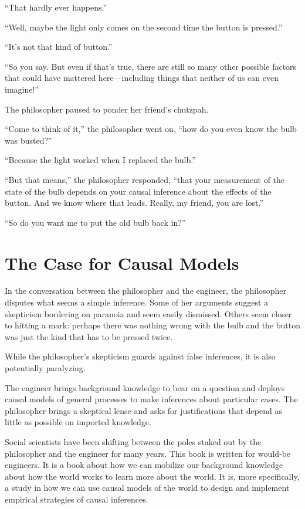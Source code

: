 \documentclass[
  12pt,
]{book}
\begin{document}
``That hardly ever happens.''

``Well, maybe the light only comes on the second time the button is pressed.''

``It's not that kind of button.''

``So you say. But even if that's true, there are still so many other possible factors that could have mattered here---including things that neither of us can even imagine!''

The philosopher paused to ponder her friend's chutzpah.

``Come to think of it,'' the philosopher went on, ``how do you even know the bulb was busted?''

``Because the light worked when I replaced the bulb.''

``But that means,'' the philosopher responded, ``that your measurement of the state of the bulb depends on your causal inference about the effects of the button. And we know where that leads. Really, my friend, you are lost.''

``So do you want me to put the old bulb back in?''

\hypertarget{the-case-for-causal-models}{%
\section{The Case for Causal Models}\label{the-case-for-causal-models}}

In the conversation between the philosopher and the engineer, the philosopher disputes what seems a simple inference. Some of her arguments suggest a skepticism bordering on paranoia and seem easily dismissed. Others seem closer to hitting a mark: perhaps there was nothing wrong with the bulb and the button was just the kind that has to be pressed twice.

While the philosopher's skepticism guards against false inferences, it is also potentially paralyzing.

The engineer brings background knowledge to bear on a question and deploys causal models of general processes to make inferences about particular cases. The philosopher brings a skeptical lense and asks for justifications that depend as little as possible on imported knowledge.

Social scientists have been shifting between the poles staked out by the philosopher and the engineer for many years. This book is written for would-be engineers. It is a book about how we can mobilize our background knowledge about how the world works to learn more about the world. It is, more specifically, a study in how we can use causal models of the world to design and implement empirical strategies of causal inferences.
\end{document}

